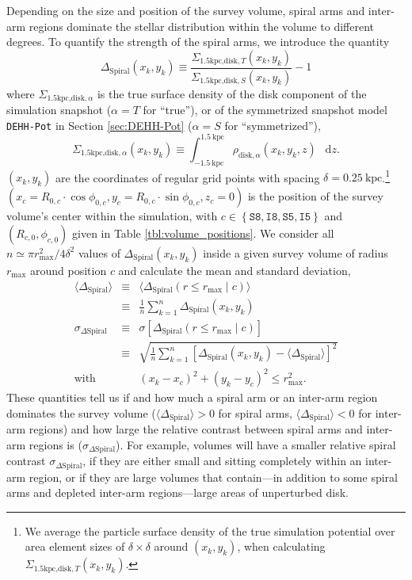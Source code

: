 \documentclass[iop,revtex4,numberedappendix,appendixfloats]{emulateapj}
\newcommand*\diff{\mathop{}\!\mathrm{d}}
\begin{document}
Depending on the size and position of the survey volume, spiral arms and inter-arm regions dominate the stellar distribution within the volume to different degrees. To quantify the strength of the spiral arms, we introduce the quantity
\begin{equation}
\Delta_\text{Spiral} (x_k,y_k) \equiv \frac{\Sigma_{\text{1.5kpc,disk},T}(x_k,y_k)}{\Sigma_{\text{1.5kpc,disk},S}(x_k,y_k)} -1\label{eq:DeltaS_definition}
\end{equation}
where $\Sigma_{\text{1.5kpc,disk},\alpha}$ is the true surface density of the disk component of the simulation snapshot ($\alpha=T$ for ``true''), or of the symmetrized snapshot model \texttt{DEHH-Pot} in Section \ref{sec:DEHH-Pot} ($\alpha=S$ for ``symmetrized''),
\begin{equation}
\Sigma_{\text{1.5kpc,disk},\alpha}(x_k,y_k) \equiv \int_{-1.5~\text{kpc}}^{1.5~\text{kpc}} \rho_{\text{disk},\alpha}(x_k,y_k,z) \ \diff z.
\end{equation}
$(x_k,y_k)$ are the coordinates of regular grid points with spacing $\delta=0.25~\text{kpc}$.\footnote{We average the particle surface density of the true simulation potential over area element sizes of $\delta \times \delta$ around $(x_k,y_k)$, when calculating $\Sigma_{\text{1.5kpc,disk},T}(x_k,y_k)$.} $(x_c=R_{0,c} \cdot \cos \phi_{0,c},y_c=R_{0,c} \cdot \sin \phi_{0,c},z_c=0)$ is the position of the survey volume's center within the simulation, with $c\in\left\{ \texttt{S8},\texttt{I8},\texttt{S5},\texttt{I5}\right\}$ and $(R_{c,0},\phi_{c,0})$ given in Table \ref{tbl:volume_positions}. We consider all $n \simeq \pi r_\text{max}^2/4\delta^2$ values of $\Delta_\text{Spiral} (x_k,y_k)$ inside a given survey volume of radius $r_\text{max}$ around position $c$ and calculate the mean and standard deviation,
\begin{eqnarray}
\langle \Delta_\text{Spiral} \rangle &\equiv& \langle \Delta_\text{Spiral} (r \leq r_\text{max} \mid c) \rangle \nonumber\\
&\equiv & \frac 1n \sum_{k=1}^n \Delta_\text{Spiral}(x_k,y_k)\label{eq:mean_DeltaS}\\
\sigma_{\Delta\text{Spiral}} &\equiv& \sigma[\Delta_\text{Spiral}(r \leq r_\text{max} \mid c)]  \nonumber\\
&\equiv &  \sqrt{\frac 1n \sum_{k=1}^{n} \left[ \Delta_\text{Spiral}(x_k,y_k) -  \langle \Delta_\text{Spiral} \rangle \right]^2}\label{eq:std_DeltaS}\\
 \text{with } && (x_k-x_c)^2 + (y_k-y_c)^2 \leq r_\text{max}^2.
\end{eqnarray}
These quantities tell us if and how much a spiral arm or an inter-arm region dominates the survey volume ($\langle \Delta_\text{Spiral} \rangle > 0$ for spiral arms, $\langle \Delta_\text{Spiral} \rangle < 0$ for inter-arm regions) and how large the relative contrast between spiral arms and inter-arm regions is ($\sigma_{\Delta\text{Spiral}}$). For example, volumes will have a smaller relative spiral contrast $\sigma_{\Delta\text{Spiral}}$, if they are either small and sitting completely within an inter-arm region, or if they are large volumes that contain---in addition to some spiral arms and depleted inter-arm regions---large areas of unperturbed disk.
\end{document}
